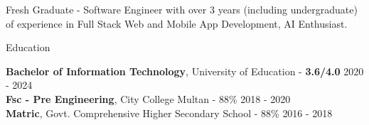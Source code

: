 \documentclass{resume} %
\begin{document}

\begin{rSection}%

{Fresh Graduate - Software Engineer with over 3 years (including undergraduate) of experience in Full Stack Web and Mobile App Development, AI Enthusiast.}


\end{rSection}

\begin{rSection}{Education}


{\bf Bachelor of Information Technology}, University of Education - {\bf 3.6/4.0 }\hfill {2020 - 2024} 
\\
{\bf Fsc  - Pre Engineering}, City College Multan - 88\% \hfill {2018 - 2020}
\\
{\bf Matric}, Govt. Comprehensive Higher Secondary School - 88\% \hfill {2016 - 2018}


\end{rSection}
\end{document}
